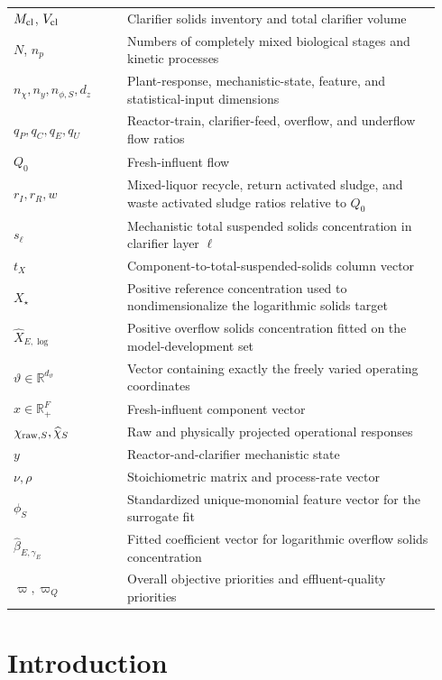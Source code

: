 \documentclass[a4paper,fleqn]{cas-sc}
\newcommand{\R}{\mathbb{R}}
\begin{document}
\begin{longtable}{p{0.25\linewidth}p{0.69\linewidth}}
$M_{\rm cl}$, $V_{\rm cl}$ & Clarifier solids inventory and total clarifier volume\\
$N$, $n_p$ & Numbers of completely mixed biological stages and kinetic processes\\
$n_\chi,n_y,n_{\phi,S},d_z$ & Plant-response, mechanistic-state, feature, and statistical-input dimensions\\
$q_P,q_C,q_E,q_U$ & Reactor-train, clarifier-feed, overflow, and underflow flow ratios\\
$Q_0$ & Fresh-influent flow\\
$r_I,r_R,w$ & Mixed-liquor recycle, return activated sludge, and waste activated sludge ratios relative to $Q_0$\\
$s_\ell$ & Mechanistic total suspended solids concentration in clarifier layer $\ell$\\
$t_X$ & Component-to-total-suspended-solids column vector\\
$X_\star$ & Positive reference concentration used to nondimensionalize the logarithmic solids target\\
$\widehat X_{E,\log}$ & Positive overflow solids concentration fitted on the model-development set\\
$\vartheta\in\R^{d_\vartheta}$ & Vector containing exactly the freely varied operating coordinates\\
$x\in\R_+^F$ & Fresh-influent component vector\\
$\chi_{{\rm raw},S},\widehat\chi_S$ & Raw and physically projected operational responses\\
$y$ & Reactor-and-clarifier mechanistic state\\
$\nu,\rho$ & Stoichiometric matrix and process-rate vector\\
$\phi_S$ & Standardized unique-monomial feature vector for the surrogate fit\\
$\widehat\beta_{E,\gamma_E}$ & Fitted coefficient vector for logarithmic overflow solids concentration\\
$\varpi,\varpi_Q$ & Overall objective priorities and effluent-quality priorities\\
\end{longtable}

\section{Introduction}
\end{document}
